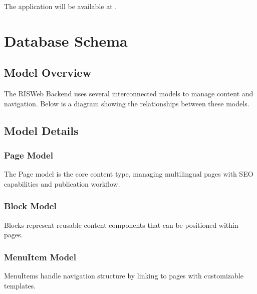 \documentclass[letterpaper,10pt,english]{sphinxmanual}
\begin{document}
\begin{sphinxVerbatim}[commandchars=\\\{\}]
  
\end{sphinxVerbatim}

\sphinxAtStartPar
The application will be available at .

\sphinxstepscope


\section{Database Schema}
\label{\detokenize{models/db_schema:database-schema}}\label{\detokenize{models/db_schema::doc}}

\subsection{Model Overview}
\label{\detokenize{models/db_schema:model-overview}}
\sphinxAtStartPar
The RIS\sphinxhyphen{}Web Backend uses several interconnected models to manage content and navigation. Below is a diagram showing the relationships between these models.

\noindent{}


\subsection{Model Details}
\label{\detokenize{models/db_schema:model-details}}

\subsubsection{Page Model}
\label{\detokenize{models/db_schema:page-model}}
\sphinxAtStartPar
The Page model is the core content type, managing multilingual pages with SEO capabilities and publication workflow.


\subsubsection{Block Model}
\label{\detokenize{models/db_schema:block-model}}
\sphinxAtStartPar
Blocks represent reusable content components that can be positioned within pages.


\subsubsection{MenuItem Model}
\label{\detokenize{models/db_schema:menuitem-model}}
\sphinxAtStartPar
MenuItems handle navigation structure by linking to pages with customizable templates.
\end{document}
